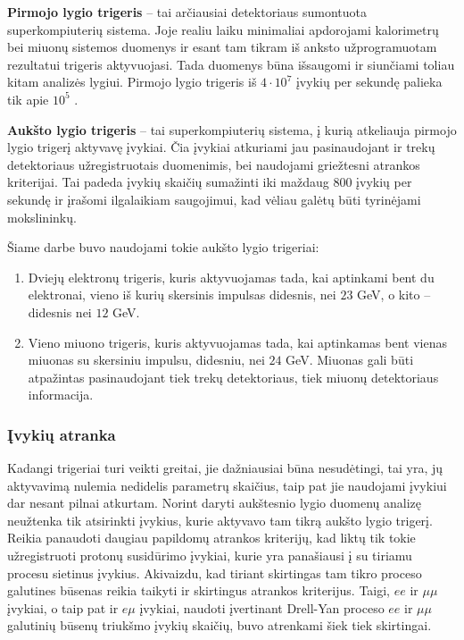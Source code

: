 \documentclass[a4paper, 12pt]{article}
\newcommand{\mumu}{\mu\mu}
\begin{document}
\textbf{Pirmojo lygio trigeris} -- tai arčiausiai detektoriaus sumontuota superkompiuterių sistema.
Joje realiu laiku minimaliai apdorojami kalorimetrų bei miuonų sistemos duomenys ir esant tam tikram iš
anksto užprogramuotam rezultatui trigeris aktyvuojasi.
Tada duomenys būna išsaugomi ir siunčiami toliau kitam analizės lygiui.
Pirmojo lygio trigeris iš $4 \! \cdot \! 10^{7}$  įvykių per sekundę palieka tik apie $10^{5}$ \cite{HLtrigger}.

\textbf{Aukšto lygio trigeris} -- tai superkompiuterių sistema, į kurią atkeliauja pirmojo lygio trigerį
aktyvavę įvykiai.
Čia įvykiai atkuriami jau pasinaudojant ir trekų detektoriaus užregistruotais duomenimis, bei naudojami
griežtesni atrankos kriterijai.
Tai padeda įvykių skaičių sumažinti iki maždaug $800$ įvykių per sekundę ir įrašomi ilgalaikiam saugojimui,
kad vėliau galėtų būti tyrinėjami mokslininkų.

Šiame darbe buvo naudojami tokie aukšto lygio trigeriai:
\begin{enumerate}
\item Dviejų elektronų trigeris, kuris aktyvuojamas tada, kai aptinkami bent du elektronai, vieno iš kurių skersinis
impulsas didesnis, nei $23$ GeV, o kito -- didesnis nei $12$ GeV.
\item Vieno miuono trigeris, kuris aktyvuojamas tada, kai aptinkamas bent vienas miuonas su skersiniu impulsu,
didesniu, nei $24$ GeV. Miuonas gali būti atpažintas pasinaudojant tiek trekų detektoriaus, tiek miuonų
detektoriaus informacija.
\end{enumerate}


\subsubsection{Įvykių atranka}\label{sec:selection}

Kadangi trigeriai turi veikti greitai, jie dažniausiai būna nesudėtingi, tai yra, jų aktyvavimą nulemia
nedidelis parametrų skaičius, taip pat jie naudojami įvykiui dar nesant pilnai atkurtam.
Norint daryti aukštesnio lygio duomenų analizę neužtenka tik atsirinkti įvykius, kurie aktyvavo tam tikrą
aukšto lygio trigerį.
Reikia panaudoti daugiau papildomų atrankos kriterijų, kad liktų tik tokie užregistruoti protonų susidūrimo
įvykiai, kurie yra panašiausi į su tiriamu procesu sietinus įvykius.
Akivaizdu, kad tiriant skirtingas tam tikro proceso galutines būsenas reikia taikyti ir skirtingus atrankos
kriterijus.
Taigi, $ee$ ir $\mumu$ įvykiai, o taip pat ir $e\mu$ įvykiai, naudoti įvertinant Drell-Yan proceso $ee$ ir
$\mumu$ galutinių būsenų triukšmo įvykių skaičių, buvo atrenkami šiek tiek skirtingai.
\end{document}
